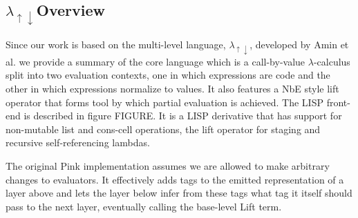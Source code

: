 \documentclass[fleqn]{article}
\theoremstyle{definition}
\newcommand{\mslang}{$\lambda_{\uparrow\downarrow}$}
\begin{document}
\subsection{\mslang Overview}
Since our work is based on the multi-level language, \mslang, developed by Amin et al. \cite{amin2017collapsing} we provide a summary of the core language which is a call-by-value $\lambda$-calculus split into two evaluation contexts, one in which expressions are code and the other in which expressions normalize to values. It also features a NbE style lift operator that forms tool by which partial evaluation is achieved. The LISP front-end is described in figure FIGURE. It is a LISP derivative that has support for non-mutable list and cons-cell operations, the lift operator for staging and recursive self-referencing lambdas.


The original Pink implementation assumes we are allowed to make arbitrary changes to evaluators. It effectively adds tags to the emitted representation of a layer above and lets the layer below infer from these tags what tag it itself should pass to the next layer, eventually calling the base-level Lift term.
\end{document}
